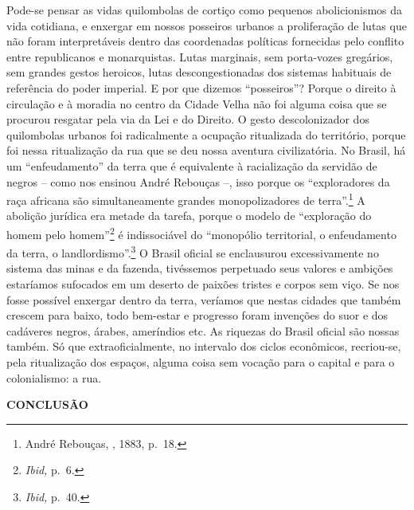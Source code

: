 Pode-se pensar as vidas quilombolas de cortiço como pequenos
abolicionismos da vida cotidiana, e enxergar em nossos posseiros urbanos
a proliferação de lutas que não foram interpretáveis dentro das
coordenadas políticas fornecidas pelo conflito entre republicanos e
monarquistas. Lutas marginais, sem porta-vozes gregários, sem grandes
gestos heroicos, lutas descongestionadas dos sistemas habituais de
referência do poder imperial. E por que dizemos ``posseiros''? Porque o
direito à circulação e à moradia no centro da Cidade Velha não foi
alguma coisa que se procurou resgatar pela via da Lei e do Direito. O
gesto descolonizador dos quilombolas urbanos foi radicalmente a ocupação
ritualizada do território, porque foi nessa ritualização da rua que se
deu nossa aventura civilizatória. No Brasil, há um ``enfeudamento'' da
terra que é equivalente à racialização da servidão de negros -- como nos
ensinou André Rebouças --, isso porque os ``exploradores da raça
africana são simultaneamente grandes monopolizadores de
terra''.\footnote{André Rebouças, , 1883, p.~18.} A abolição jurídica
era metade da tarefa, porque o modelo de ``exploração do homem pelo
homem''\footnote{\emph{Ibid,} p.~6.} é indissociável do ``monopólio
territorial, o enfeudamento da terra, o landlordismo''.\footnote{\emph{Ibid,}
  p.~40.} O Brasil oficial se enclausurou excessivamente no sistema das
minas e da fazenda, tivéssemos perpetuado seus valores e ambições
estaríamos sufocados em um deserto de paixões tristes e corpos sem viço.
Se nos fosse possível enxergar dentro da terra, veríamos que nestas
cidades que também crescem para baixo, todo bem-estar e progresso foram
invenções do suor e dos cadáveres negros, árabes, ameríndios etc. As
riquezas do Brasil oficial são nossas também. Só que extraoficialmente,
no intervalo dos ciclos econômicos, recriou-se, pela ritualização dos
espaços, alguma coisa sem vocação para o capital e para o colonialismo:
a rua.

\textbf{CONCLUSÃO}


